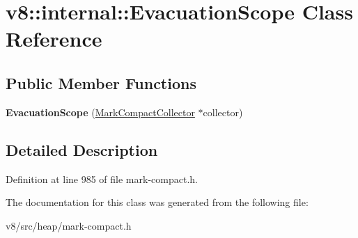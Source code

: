 \hypertarget{classv8_1_1internal_1_1EvacuationScope}{}\section{v8\+:\+:internal\+:\+:Evacuation\+Scope Class Reference}
\label{classv8_1_1internal_1_1EvacuationScope}
\subsection*{Public Member Functions}
\begin{DoxyCompactItemize}
\item 
\mbox{\label{classv8_1_1internal_1_1EvacuationScope_a34bafee1a316374175ee3ae47c62d2df}} 
{\bfseries Evacuation\+Scope} (\mbox{\hyperlink{classv8_1_1internal_1_1MarkCompactCollector}{Mark\+Compact\+Collector}} $\ast$collector)
\end{DoxyCompactItemize}


\subsection{Detailed Description}


Definition at line 985 of file mark-\/compact.\+h.



The documentation for this class was generated from the following file\+:\begin{DoxyCompactItemize}
\item 
v8/src/heap/mark-\/compact.\+h\end{DoxyCompactItemize}
